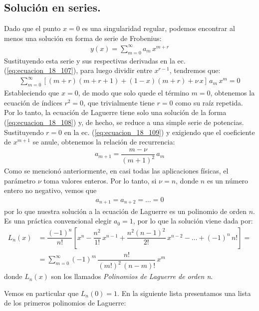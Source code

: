 \subsection{Solución en series.}
Dado que el punto $x = 0$ es una singularidad regular, podemos encontrar al menos una solución en forma de serie de Frobenius:
\begin{align}
y(x) = \sum_{m=0}^{\infty} a_{m} \, x^{m+r}
\label{eq:ecuacion_18_108}
\end{align}
Sustituyendo esta serie y sus respectivas derivadas en la ec. (\ref*{eq:ecuacion_18_107}), para luego dividir entre $x^{r-1}$, tendremos que:
\begin{align}
\sum_{m=0}^{\infty} [(m + r)(m + r + 1) + (1 - x)(m + r) + \nu \, x ] \, a_{m} \, x^{m} = 0
\label{eq:ecuacion_18_109}
\end{align}
Estableciendo que $x = 0$, de modo que solo quede el término $m = 0$, obtenemos la ecuación de índices $r^{2} = 0$, que trivialmente tiene $r = 0$ como su raíz repetida. Por lo tanto, la ecuación de Laguerre tiene solo una solución de la forma (\ref{eq:ecuacion_18_108}) y, de hecho, se reduce a una simple serie de potencias. Sustituyendo $r = 0$ en la ec. (\ref{eq:ecuacion_18_109}) y exigiendo que el coeficiente de $x^{m+1}$ se anule, obtenemos la relación de recurrencia:
\begin{align}
a_{m+1} = \dfrac{m - \nu}{(m + 1)^{2}} \, a_{m}
\end{align}
Como se mencionó anteriormente, en casi todas las aplicaciones físicas, el parámetro $\nu$ toma valores enteros. Por lo tanto, si $\nu = n$, donde $n$ es un número entero no negativo, vemos que 
\begin{align*}
a_{n+1} = a_{n+2} =\ldots = 0
\end{align*}
por lo que nuestra solución a la ecuación de Laguerre es un polinomio de orden $n$. Es una práctica convencional elegir $a_{0} = 1$, por lo que la solución viene dada por:
\begin{align}
L_{n} (x) &= \dfrac{(-1)^{n}}{n!} \left[ x^{n} - \dfrac{n^{2}}{1!} \, x^{n-1} + \dfrac{n^{2}(n - 1)^{2}}{2!} \, x^{n-2} - \ldots + (-1)^{n} \, n! \right] = \label{eq:ecuacion_18_110} \\[0.5em]
&= \sum_{m=0}^{\infty} (-1)^{m} \, \dfrac{n!}{(m!)^{2} \, (n - m)!} \, x^{m} \label{eq:ecuacion_18_111}
\end{align}
donde $L_{n}(x)$ son los llamados \emph{Polinomios de Laguerre de orden n}.
\par
Vemos en particular que $L_{n}(0) = 1$. En la siguiente lista presentamos una lista de los primeros polinomios de Laguerre:
